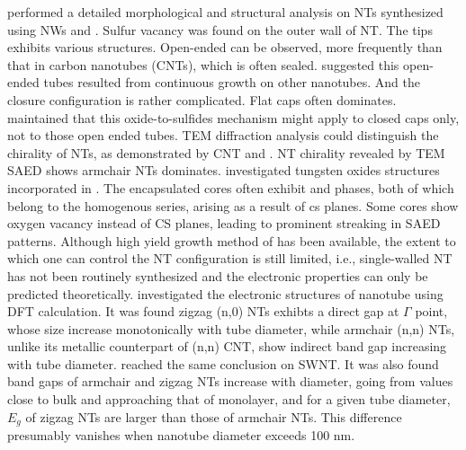\citeauthor{Zhu2000} performed a detailed morphological and structural analysis on  NTs synthesized using  NWs and .\cite{Zhu2000} Sulfur vacancy was found on the outer wall of NT. The tips exhibits various structures. Open-ended can be observed, more frequently than that in carbon nanotubes (CNTs), which is often sealed. \citeauthor{Zhu2000} suggested this open-ended tubes resulted from continuous growth on other nanotubes. And the closure configuration is rather complicated. Flat caps often dominates. \citeauthor{Zhu2000} maintained that this oxide-to-sulfides mechanism might apply to closed caps only, not to those open ended tubes.\cite{Zhu2000} TEM diffraction analysis could distinguish the chirality of NTs, as demonstrated by CNT \cite{Zhang1993} and \cite{MARGULIS1996}.  NT chirality revealed by TEM SAED shows armchair NTs dominates. \citeauthor{Sloan1999} investigated tungsten oxides structures incorporated in .\cite{Sloan1999} The encapsulated  cores often exhibit  and  phases, both of which belong to the  homogenous series, arising as a result of \gls{cs} planes.\cite{Miyano} Some  cores show oxygen vacancy instead of CS planes, leading to prominent streaking in SAED patterns. Although high yield growth method of  has been available, the extent to which one can control the NT configuration is still limited, i.e., single-walled NT has not been routinely synthesized and the electronic properties can only be predicted theoretically. \citeauthor{Seifert2000} investigated the electronic structures of  nanotube using DFT calculation.\cite{Seifert2000} It was found zigzag (n,0) NTs exhibts a direct gap at $\Gamma$ point, whose size increase monotonically with tube diameter, while armchair (n,n) NTs, unlike its metallic counterpart of (n,n) CNT, show indirect band gap increasing with tube diameter. \citeauthor{Zibouche2012} reached the same conclusion on  SWNT.\cite{Zibouche2012} It was also found band gaps of armchair and zigzag NTs increase with diameter, going from values close to bulk and approaching that of  monolayer, and for a given tube diameter, $E_g$ of zigzag NTs are larger than those of armchair NTs. This difference presumably vanishes when nanotube diameter exceeds 100 nm.

